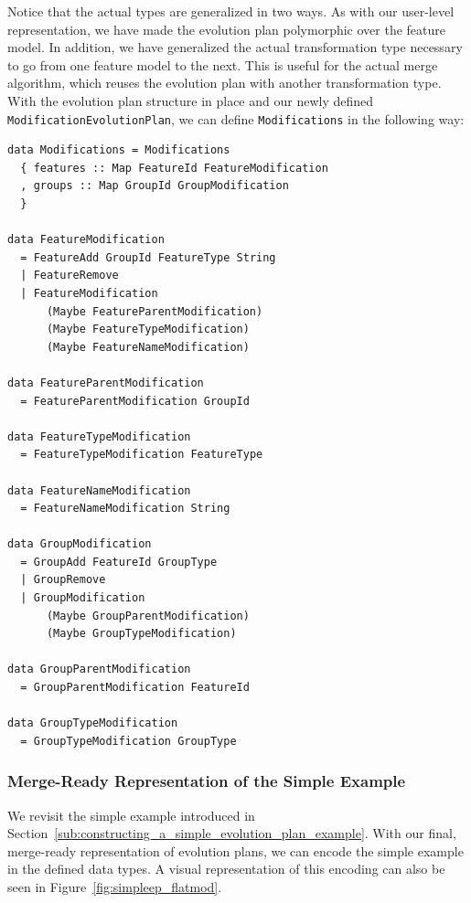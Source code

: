 \documentclass[a4paper,english]{ifimaster}
\begin{document}
Notice that the actual types are generalized in two ways. As with our user-level representation, we have made the evolution plan polymorphic over the feature model. In addition, we have generalized the actual transformation type necessary to go from one feature model to the next. This is useful for the actual merge algorithm, which reuses the evolution plan with another transformation type. With the evolution plan structure in place and our newly defined \texttt{Modification\-Evolution\-Plan}, we can define \texttt{Modifications} in the following way:

\begin{verbatim}
data Modifications = Modifications
  { features :: Map FeatureId FeatureModification
  , groups :: Map GroupId GroupModification
  }

data FeatureModification
  = FeatureAdd GroupId FeatureType String
  | FeatureRemove
  | FeatureModification
      (Maybe FeatureParentModification)
      (Maybe FeatureTypeModification)
      (Maybe FeatureNameModification)

data FeatureParentModification
  = FeatureParentModification GroupId

data FeatureTypeModification
  = FeatureTypeModification FeatureType

data FeatureNameModification
  = FeatureNameModification String

data GroupModification
  = GroupAdd FeatureId GroupType
  | GroupRemove
  | GroupModification
      (Maybe GroupParentModification)
      (Maybe GroupTypeModification)

data GroupParentModification
  = GroupParentModification FeatureId

data GroupTypeModification
  = GroupTypeModification GroupType
\end{verbatim}

\subsubsection{Merge-Ready Representation of the Simple Example}%
\label{ssub:merge_ready_representation_of_the_simple_example}

We revisit the simple example introduced in Section~\vref{sub:constructing_a_simple_evolution_plan_example}. With our final, merge-ready representation of evolution plans, we can encode the simple example in the defined data types. A visual representation of this encoding can also be seen in Figure~\vref{fig:simpleep_flatmod}.
\end{document}
